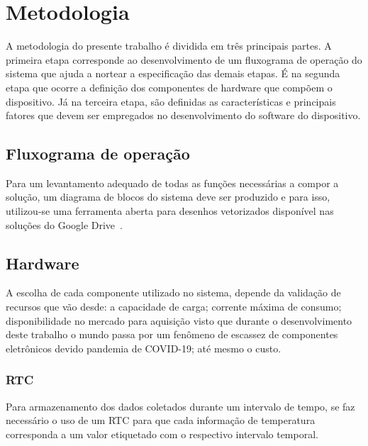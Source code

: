 \chapter{Metodologia}
A metodologia do presente trabalho é dividida em três principais partes. A primeira etapa corresponde ao desenvolvimento de um fluxograma de operação do sistema que ajuda a nortear a especificação das demais etapas. É na segunda etapa que ocorre a definição dos componentes de hardware que compõem o dispositivo. Já na terceira etapa, são definidas as características e principais fatores que devem ser empregados no desenvolvimento do software do dispositivo.



\section{Fluxograma de operação}
Para um levantamento adequado de todas as funções necessárias a compor a solução, um diagrama de blocos do sistema deve ser produzido e para isso, utilizou-se uma ferramenta aberta para desenhos vetorizados disponível nas soluções do Google Drive~\cite{Gallaway2013}.


\section{Hardware}
A escolha de cada componente utilizado no sistema, depende da validação de recursos que vão desde: a capacidade de carga; corrente máxima de consumo; disponibilidade no mercado para aquisição visto que durante o desenvolvimento deste trabalho o mundo passa por um fenômeno de escassez de componentes eletrônicos devido pandemia de COVID-19; até mesmo o custo.

\subsection{RTC}
Para armazenamento dos dados coletados durante um intervalo de tempo, se faz necessário o uso de um RTC para que cada informação de temperatura corresponda a um valor etiquetado com o respectivo intervalo temporal. 

